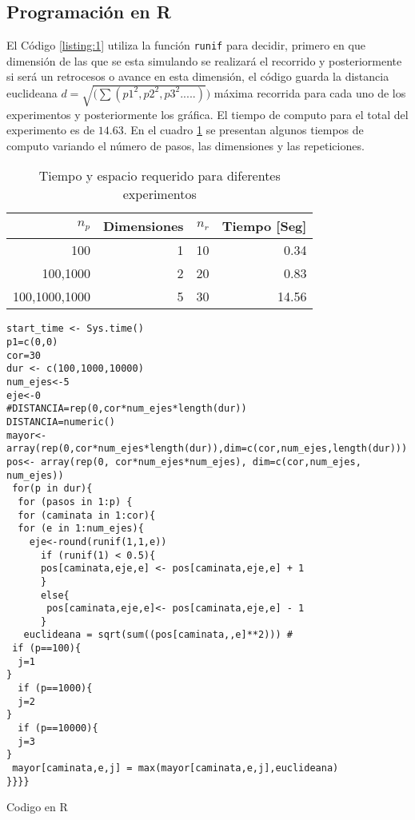 \documentclass{article}
\renewcommand\lstlistingname{Código}
\begin{document}
\subsection{Programación en R}
El  Código \ref{listing:1} utiliza la función  \texttt{runif} para decidir, primero en que dimensión de las que se esta simulando se realizará el recorrido y posteriormente si será un retrocesos o avance en esta dimensión, el código guarda la distancia euclideana $d=\sqrt{(\sum(p1^2,p2^2,p3^2.....)})$ máxima recorrida  para cada uno de los experimentos y posteriormente los gráfica. El tiempo de computo para el total del experimento es de $14.63$. En el cuadro \ref{cuadro 1} se presentan algunos tiempos de computo variando el número de pasos, las dimensiones y las repeticiones.

\begin{table}[]
\centering
\caption{Tiempo y espacio requerido para diferentes experimentos}
\label{cuadro 1}
\begin{tabular}{|r|r|r|r|}
\hline
\textbf{$n_p$} & \textbf{Dimensiones} & \textbf{$n_r$} & \textbf{Tiempo {[}Seg{]}} \\ \hline
100            & 1                    & 10                    & 0.34                      \\ \hline
100,1000       & 2                    & 20                    & 0.83                      \\ \hline
100,1000,1000  & 5                    & 30                    & 14.56                     \\ \hline        
\end{tabular}
\end{table}
\lstset{language=Python}
\lstset{frame=lines}
\lstset{basicstyle=\footnotesize}
\begin{listing}
\renewcommand\lstlistingname{Código}
\begin{verbatim}
start_time <- Sys.time()
p1=c(0,0)
cor=30
dur <- c(100,1000,10000)
num_ejes<-5
eje<-0
#DISTANCIA=rep(0,cor*num_ejes*length(dur))
DISTANCIA=numeric()
mayor<-array(rep(0,cor*num_ejes*length(dur)),dim=c(cor,num_ejes,length(dur)))
pos<- array(rep(0, cor*num_ejes*num_ejes), dim=c(cor,num_ejes, num_ejes))
 for(p in dur){
  for (pasos in 1:p) {
  for (caminata in 1:cor){
  for (e in 1:num_ejes){
    eje<-round(runif(1,1,e))
      if (runif(1) < 0.5){
      pos[caminata,eje,e] <- pos[caminata,eje,e] + 1
      }
      else{
       pos[caminata,eje,e]<- pos[caminata,eje,e] - 1
      }
   euclideana = sqrt(sum((pos[caminata,,e]**2))) # 
 if (p==100){
  j=1
}
  if (p==1000){
  j=2
}
  if (p==10000){
  j=3
}
 mayor[caminata,e,j] = max(mayor[caminata,e,j],euclideana)
}}}}

\end{verbatim}
\caption{Codigo en R}
\label{listing:1}
\end{listing}
\end{document}
